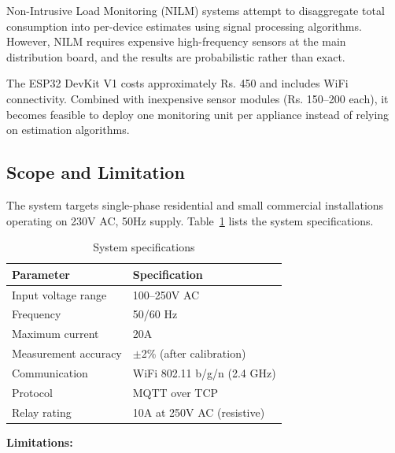\documentclass[12pt, a4paper]{article}
\begin{document}
	Non-Intrusive Load Monitoring (NILM) systems attempt to disaggregate total consumption into per-device estimates using signal processing algorithms. However, NILM requires expensive high-frequency sensors at the main distribution board, and the results are probabilistic rather than exact.
	
	The ESP32 DevKit V1 costs approximately Rs. 450 and includes WiFi connectivity. Combined with inexpensive sensor modules (Rs. 150--200 each), it becomes feasible to deploy one monitoring unit per appliance instead of relying on estimation algorithms.
	
	\subsection{Scope and Limitation}
	
	The system targets single-phase residential and small commercial installations operating on 230V AC, 50Hz supply. Table~\ref{tab:specs} lists the system specifications.
	
	\begin{table}[H]
		\centering
		\caption{System specifications}
		\label{tab:specs}
		\vspace{6pt}
		\begin{tabular}{|l|l|}
			\hline
			\textbf{Parameter} & \textbf{Specification} \\
			\hline
			Input voltage range & 100--250V AC \\
			Frequency & 50/60 Hz \\
			Maximum current & 20A \\
			Measurement accuracy & $\pm$2\% (after calibration) \\
			Communication & WiFi 802.11 b/g/n (2.4 GHz) \\
			Protocol & MQTT over TCP \\
			Relay rating & 10A at 250V AC (resistive) \\
			\hline
		\end{tabular}
	\end{table}
	
	\textbf{Limitations:}
	
\end{document}
